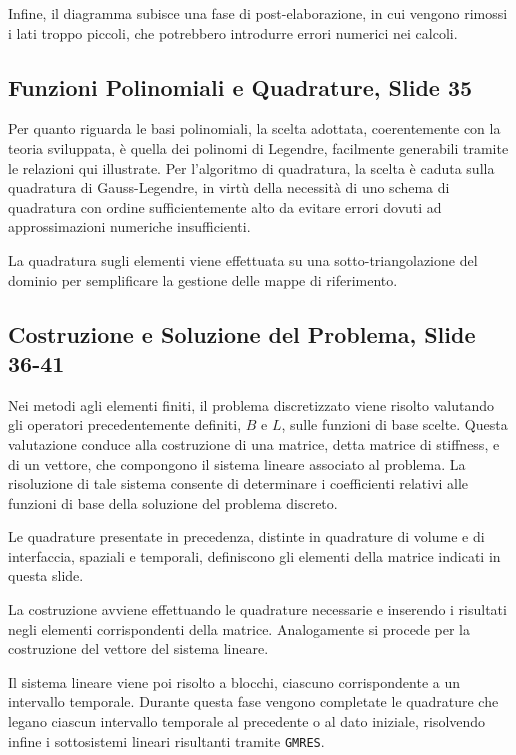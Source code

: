 \documentclass[12pt]{article}
\begin{document}
    Infine, il diagramma subisce una fase di post-elaborazione, in cui vengono rimossi i lati troppo piccoli, che potrebbero introdurre errori numerici nei calcoli.

    \subsection{Funzioni Polinomiali e Quadrature, Slide 35}

    Per quanto riguarda le basi polinomiali, la scelta adottata, coerentemente con la teoria sviluppata, è quella dei polinomi di Legendre, facilmente generabili tramite le relazioni qui illustrate. Per l'algoritmo di quadratura, la scelta è caduta sulla quadratura di Gauss-Legendre, in virtù della necessità di uno schema di quadratura con ordine sufficientemente alto da evitare errori dovuti ad approssimazioni numeriche insufficienti.

    La quadratura sugli elementi viene effettuata su una sotto-triangolazione del dominio per semplificare la gestione delle mappe di riferimento.

    \subsection{Costruzione e Soluzione del Problema, Slide 36-41}

    Nei metodi agli elementi finiti, il problema discretizzato viene risolto valutando gli operatori precedentemente definiti, $B$ e $L$, sulle funzioni di base scelte. Questa valutazione conduce alla costruzione di una matrice, detta matrice di stiffness, e di un vettore, che compongono il sistema lineare associato al problema. La risoluzione di tale sistema consente di determinare i coefficienti relativi alle funzioni di base della soluzione del problema discreto.

    Le quadrature presentate in precedenza, distinte in quadrature di volume e di interfaccia, spaziali e temporali, definiscono gli elementi della matrice indicati in questa slide.

    La costruzione avviene effettuando le quadrature necessarie e inserendo i risultati negli elementi corrispondenti della matrice. Analogamente si procede per la costruzione del vettore del sistema lineare.

    Il sistema lineare viene poi risolto a blocchi, ciascuno corrispondente a un intervallo temporale. Durante questa fase vengono completate le quadrature che legano ciascun intervallo temporale al precedente o al dato iniziale, risolvendo infine i sottosistemi lineari risultanti tramite \lstinline{GMRES}.
\end{document}
